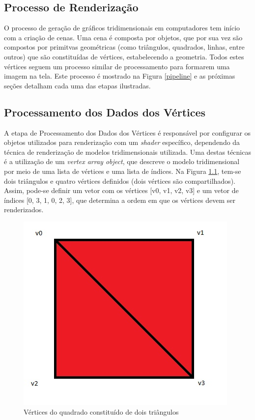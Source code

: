 \begin{anexosenv}

\partanexos

\chapter{Processo de Renderização}
\label{renderpipe}


	O processo de geração de gráficos tridimensionais em computadores tem início com a criação de cenas. Uma cena é composta por objetos, que por sua vez são compostos por primitvas geométricas (como triângulos, quadrados, linhas, entre outros) que são constituídas de vértices, estabelecendo a geometria. Todos estes vértices seguem um processo similar de processamento para formarem uma imagem na tela.  Este processo é mostrado na Figura \ref{pipeline} e as próximas seções detalham cada uma das etapas ilustradas. 

	
\section{Processamento dos Dados dos Vértices}

	A etapa de Processamento dos Dados dos Vértices é responsável por configurar os objetos utilizados para renderização com um \textit{shader} específico, dependendo da técnica de renderização de modelos tridimensionais utilizada. Uma destas técnicas é a utilização de um \textit{vertex array object}, que descreve o modelo tridimensional por meio de uma lista de vértices e uma lista de índices. Na Figura \ref{quadrado}, tem-se dois triângulos e quatro vértices definidos (dois vértices são compartilhados). Assim, pode-se definir um vetor com os vértices [v0, v1, v2, v3] e um vetor de índices [0, 3, 1, 0, 2, 3], que determina a ordem em que os vértices devem ser renderizados. 

	\begin{figure}[h]
	\centering
		\includegraphics[keepaspectratio=true,scale=0.5]{figuras/quadrado.jpg}
	\caption{Vértices do quadrado constituído de dois triângulos}
	\label{quadrado}
	\end{figure}


\end{anexosenv}
